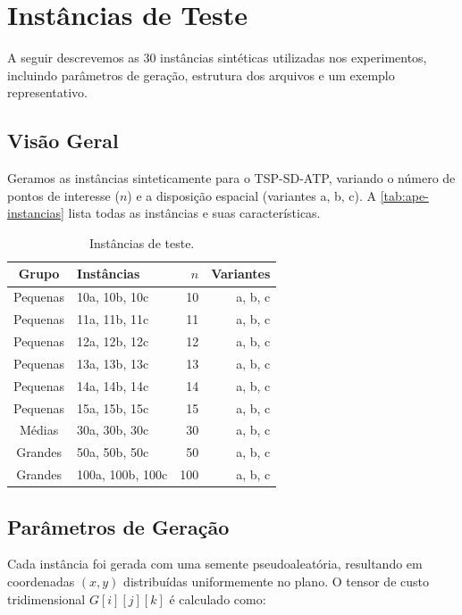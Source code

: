 \chapter[Instâncias de Teste]{Instâncias de Teste}
\label{ape:instancias}

A seguir descrevemos as 30 instâncias sintéticas utilizadas nos experimentos, incluindo parâmetros de geração, estrutura dos arquivos e um exemplo representativo.

\section{Visão Geral}

Geramos as instâncias sinteticamente para o TSP-SD-ATP, variando o número de pontos de interesse ($n$) e a disposição espacial (variantes a, b, c). A \autoref{tab:ape-instancias} lista todas as instâncias e suas características.

\begin{table}[htbp]
\centering
\caption{Instâncias de teste.}
\label{tab:ape-instancias}
\begin{tabular}{clrr}
\toprule
Grupo & Instâncias & $n$ & Variantes \\
\midrule
Pequenas & 10a, 10b, 10c & 10 & a, b, c \\
Pequenas & 11a, 11b, 11c & 11 & a, b, c \\
Pequenas & 12a, 12b, 12c & 12 & a, b, c \\
Pequenas & 13a, 13b, 13c & 13 & a, b, c \\
Pequenas & 14a, 14b, 14c & 14 & a, b, c \\
Pequenas & 15a, 15b, 15c & 15 & a, b, c \\
Médias & 30a, 30b, 30c & 30 & a, b, c \\
Grandes & 50a, 50b, 50c & 50 & a, b, c \\
Grandes & 100a, 100b, 100c & 100 & a, b, c \\
\bottomrule
\end{tabular}
\end{table}

\section{Parâmetros de Geração}

Cada instância foi gerada com uma semente pseudoaleatória, resultando em coordenadas $(x, y)$ distribuídas uniformemente no plano. O tensor de custo tridimensional $G[i][j][k]$ é calculado como:

